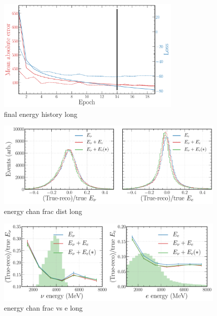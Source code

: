 \begin{figure} %
    \includegraphics[width=0.8\textwidth]{diagrams/6-cvn/chipsnet/final_energy_history.pdf}
    \caption[final energy history short]
    {final energy history long}
    \label{fig:final_energy_history}
\end{figure}




\begin{figure} %
    \includegraphics[width=\textwidth]{diagrams/6-cvn/chipsnet/energy_chan_frac_dist.pdf}
    \caption[energy chan frac dist short]
    {energy chan frac dist long}
    \label{fig:energy_chan_frac_dist}
\end{figure}

\begin{figure} %
    \includegraphics[width=\textwidth]{diagrams/6-cvn/chipsnet/energy_chan_frac_vs_e.pdf}
    \caption[energy chan frac vs e short]
    {energy chan frac vs e long}
    \label{fig:energy_chan_frac_vs_e}
\end{figure}

